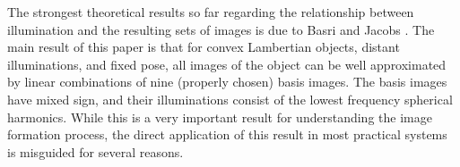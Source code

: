 \documentclass[12pt,journal,draftcls,letterpaper,onecolumn]{IEEEtran}
\begin{document}
The strongest theoretical results so far regarding the relationship
between illumination and the resulting sets of images is due to Basri and Jacobs \cite{Basri2003-PAMI}.
The main result of this paper is that for convex Lambertian objects, distant illuminations, and fixed pose,
all images of the object can be well approximated by linear combinations of
nine (properly chosen) basis images.  The basis images have mixed sign, and
their illuminations consist of the lowest frequency spherical harmonics.
While this is a very important result for understanding the image
formation process, the direct application of this result in most practical
systems is misguided for several reasons.
\end{document}
